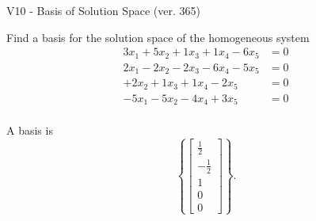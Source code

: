 \begin{exercise}
  \begin{exerciseTitle}V10 - Basis of Solution Space (ver. 365)\end{exerciseTitle}
  \begin{exerciseStatement}
    Find a basis for the solution space of the homogeneous system 
\begin{align*}
 3 x_ 1 + 5 x_ 2 + 1 x_ 3 + 1 x_ 4 -6 x_ 5 &= 0  \\ 
  2 x_ 1 -2 x_ 2 -2 x_ 3 -6 x_ 4 -5 x_ 5 &= 0  \\ 
  + 2 x_ 2 + 1 x_ 3 + 1 x_ 4 -2 x_ 5 &= 0  \\ 
  -5 x_ 1 -5 x_ 2 -4 x_ 4 + 3 x_ 5 &= 0  \\ 
 \end{align*}


 
  \end{exerciseStatement}

  \begin{exerciseAnswer}
   A basis is   
\[\left\{\left[\begin{array}{c}
\frac{1}{2} \\
-\frac{1}{2} \\
1 \\
0 \\
0
\end{array}\right]\right\}.\]

  


  \end{exerciseAnswer}
\end{exercise}